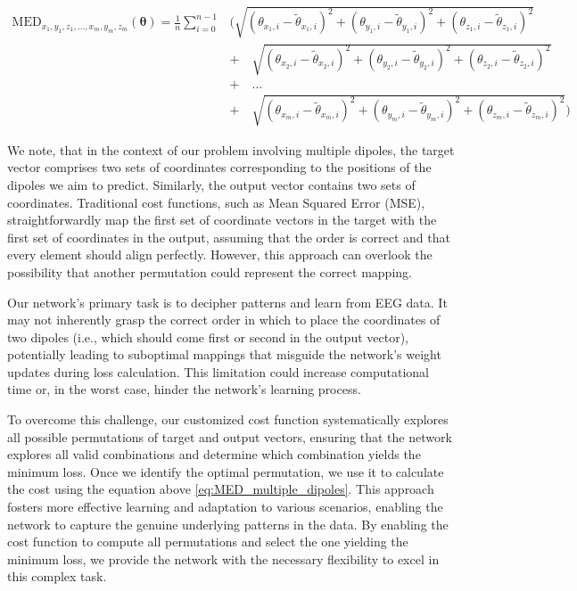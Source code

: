 \documentclass[a4paper, UKenglish, 11pt]{uiomaster}
\begin{document}
\begin{equation}
\begin{aligned}
    \text{MED}_{x_1, y_1, z_1,\ldots, x_m, y_m, z_m}(\boldsymbol{\theta}) = \frac{1}{n}\sum_{i=0}^{n-1}&\Biggl( \sqrt{(\theta_{x_1,i} - \tilde{\theta}_{x_1,i})^2 + (\theta_{y_1,i} - \tilde{\theta}_{y_1,i})^2 + (\theta_{z_1,i} - \tilde{\theta}_{z_1,i})^2} \\
    & + \quad \sqrt{(\theta_{x_2,i} - \tilde{\theta}_{x_2,i})^2 + (\theta_{y_2,i} - \tilde{\theta}_{y_2,i})^2 + (\theta_{z_2,i} - \tilde{\theta}_{z_2,i})^2}
   \\ & + \quad \ldots \\
    & + \quad \sqrt{(\theta_{x_m,i} - \tilde{\theta}_{x_m,i})^2 + (\theta_{y_m,i} - \tilde{\theta}_{y_m,i})^2 + (\theta_{z_m,i} - \tilde{\theta}_{z_m,i})^2} \Biggr)
\end{aligned}
\label{eq:MED_multiple_dipoles}
\end{equation}

We note, that in the context of our problem involving multiple dipoles, the target vector comprises two sets of coordinates corresponding to the positions of the dipoles we aim to predict. Similarly, the output vector contains two sets of coordinates. Traditional cost functions, such as Mean Squared Error (MSE), straightforwardly map the first set of coordinate vectors in the target with the first set of coordinates in the output, assuming that the order is correct and that every element should align perfectly. However, this approach can overlook the possibility that another permutation could represent the correct mapping.

Our network's primary task is to decipher patterns and learn from EEG data. It may not inherently grasp the correct order in which to place the coordinates of two dipoles (i.e., which should come first or second in the output vector), potentially leading to suboptimal mappings that misguide the network's weight updates during loss calculation. This limitation could increase computational time or, in the worst case, hinder the network's learning process.

To overcome this challenge, our customized cost function systematically explores all possible permutations of target and output vectors, ensuring that the network explores all valid combinations and determine which combination yields the minimum loss. Once we identify the optimal permutation, we use it to calculate the cost using the equation above \ref{eq:MED_multiple_dipoles}. This approach fosters more effective learning and adaptation to various scenarios, enabling the network to capture the genuine underlying patterns in the data. By enabling the cost function to compute all permutations and select the one yielding the minimum loss, we provide the network with the necessary flexibility to excel in this complex task.
\end{document}
